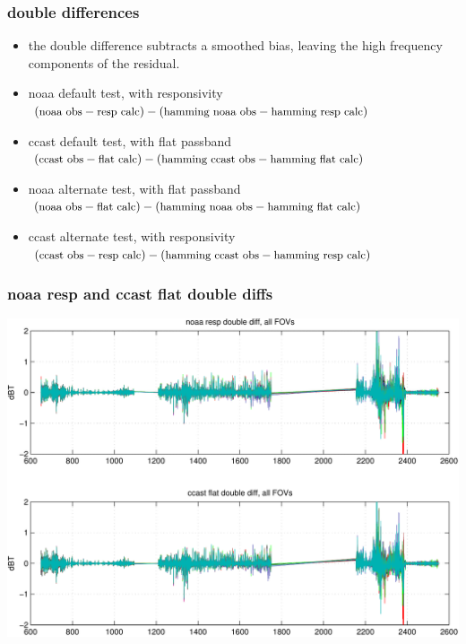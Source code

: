 \documentclass[11pt]{beamer}
\begin{document}
\begin{frame}
\frametitle{double differences}

\begin{itemize}

  \item the double difference subtracts a smoothed bias, leaving the
    high frequency components of the residual.

  \item noaa default test, with responsivity \\
    $(\mbox{\small noaa obs} - \mbox{\small resp calc}) - 
       (\mbox{\small hamming noaa obs} - 
        \mbox{\small hamming resp calc})$

  \item ccast default test, with flat passband \\
    $(\mbox{\small ccast obs} - \mbox{\small flat calc}) - 
       (\mbox{\small hamming ccast obs} - 
        \mbox{\small hamming flat calc})$

  \item noaa alternate test, with flat passband \\
    $(\mbox{\small noaa obs} - \mbox{\small flat calc}) - 
       (\mbox{\small hamming noaa obs} - 
        \mbox{\small hamming flat calc})$  

  \item ccast alternate test, with responsivity \\
    $(\mbox{\small ccast obs} - \mbox{\small resp calc}) - 
       (\mbox{\small hamming ccast obs} - 
        \mbox{\small hamming resp calc})$

\end{itemize}

\end{frame}
\begin{frame}
\frametitle{noaa resp and ccast flat double diffs}
\begin{center}
  \includegraphics[scale=0.5]{figures/cal_ddif_1.pdf}
\end{center}
\end{frame}
\end{document}
